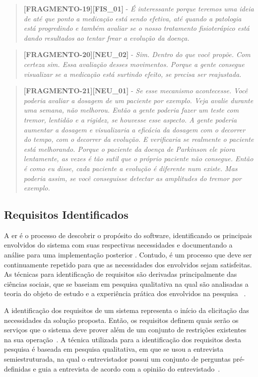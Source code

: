 \begin{quote}
\textbf{[FRAGMENTO-19][FIS\_01]} - 
\emph{
 É interessante porque teremos uma ideia de até que ponto a medicação está sendo efetiva, até quando a patologia está progredindo e também avaliar se o nosso tratamento fisioterápico está dando resultados ao tentar frear a evolução da doença.
}
\end{quote}


\begin{quote}
\textbf{[FRAGMENTO-20][NEU\_02]} - 
\emph{
Sim. Dentro do que você propõe. Com certeza sim. Essa avaliação desses movimentos. Porque a gente consegue visualizar se a medicação está surtindo efeito, se precisa ser reajustada.
}
\end{quote}

\begin{quote}
\textbf{[FRAGMENTO-21][NEU\_01]} - 
\emph{
Se esse mecanismo acontecesse. Você poderia avaliar a dosagem de um paciente por exemplo. Veja avalie durante uma semana, não melhorou. Então a gente poderia fazer um teste com tremor, lentidão e a rigidez, se houvesse esse aspecto.  A gente poderia aumentar a dosagem e visualizaria a eficácia da dosagem com o decorrer do tempo, com o decorrer da evolução. E verificaria se realmente o paciente está melhorando. Porque o paciente da doença de Parkinson ele piora lentamente, as vezes é tão sutil que o próprio paciente não consegue. Então é como eu disse, cada paciente a evolução é diferente num existe. Mas poderia assim, se você conseguisse detectar as amplitudes do tremor por exemplo.
}
\end{quote}


\subsection{Requisitos Identificados}
A \ac{er} é o processo de descobrir o propósito do software, identificando os principais envolvidos do sistema com suas respectivas necessidades e documentando a análise para uma implementação posterior \cite{bas00}. Contudo, é um processo que deve ser continuamente repetido para que as necessidades dos envolvidos sejam satisfeitas. As técnicas para identificação de requisitos são derivadas principalmente das ciências sociais, que se baseiam em pesquisa qualitativa na qual são analisadas a teoria do objeto de estudo e a experiência prática dos envolvidos na pesquisa ~\cite{elicquest05,zowghi2005}.

A identificação dos requisitos de um sistema representa o início da elicitação das necessidades da solução proposta. Então, os requisitos definem quais serão os serviços que o sistema deve prover além de um conjunto de restrições existentes na sua operação~\cite{sommerville2011}. A técnica utilizada para a identificação dos requisitos desta pesquisa é baseada em pesquisa qualitativa, em que se usou a entrevista semiestruturada, na qual o entrevistador possui um conjunto de perguntas pré-definidas e guia a entrevista de acordo com a opinião do entrevistado~\cite{FLI04}.


